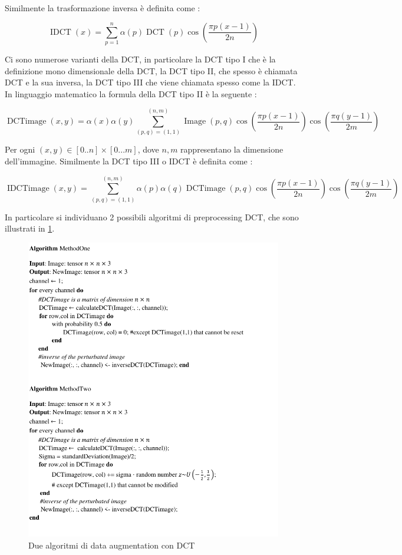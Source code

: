 Similmente la trasformazione inversa è definita come \cite{syed_dct}:

\[\operatorname{IDCT}(x)=\sum^{n}_{p=1} \alpha(p)\operatorname{DCT}(p) \cos \left(\frac { \pi p  (x- 1) } { 2 n }\right)\]


Ci sono numerose varianti della DCT, in particolare la DCT tipo I che è la definizione mono dimensionale della DCT, la DCT tipo II, che spesso è chiamata DCT e la sua inversa, la DCT tipo III che viene chiamata spesso come la IDCT. In linguaggio matematico la formula della DCT tipo II è la seguente \cite{syed_dct} \cite{gonzalez_dip} \cite{nanni_dct_pca}:


\[\operatorname{DCTimage} ( x , y ) = \alpha( x ) \alpha (y) \sum _ { (p , q) = (1,1) } ^ { (n,m) }  \operatorname { Image } ( p , q ) \cos \left(\frac { \pi p  (x-1) } { 2 n }  \right) \cos \left(\frac { \pi q  (y-1) } { 2 m }  \right) \]

Per ogni \((x,y) \in [0..n]\times [0...m]\), dove \(n,m\) rappresentano la dimensione dell'immagine. Similmente la DCT tipo III o IDCT è definita come \cite{syed_dct} \cite{gonzalez_dip}:

\[\operatorname{IDCTimage} ( x , y ) = \sum _ { (p , q) = (1,1) } ^ { (n,m) } \alpha( p ) \alpha (q) \operatorname { DCTimage } ( p , q ) \cos \left(\frac {  \pi p  (x-1) } { 2 n }  \right) \cos \left(\frac { \pi q  (y-1) } { 2 m }  \right) \]

In particolare si individuano 2 possibili algoritmi di preprocessing DCT, che sono illustrati in \cref{fig:dct-algoritmi}.
\begin{figure}[ht]
    \centering
    \includegraphics[width=1\textwidth]{addestramento-rete-neurale/Algorithm-MethodDCT.pdf}
    \caption{Due algoritmi di data augmentation con DCT}
    \label{fig:dct-algoritmi}
\end{figure}
